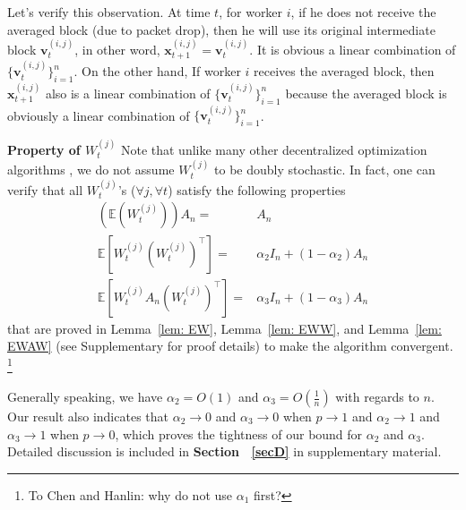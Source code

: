\documentclass{article}
\renewcommand{\paragraph}[1]{\noindent\textbf{#1}}
\def\rc{\color{red}}
\newcounter{ass_counter}
\newcounter{thm_counter}
\begin{document}
Let's verify this observation. At time $t$, for worker $i$, if he does not receive the averaged block (due to packet drop), then he will use its original intermediate block $\bm{v}_t^{(i,j)}$, in other word, $\bm{x}_{t+1}^{(i,j)} = \bm{v}_t^{(i,j)}$. It is obvious a linear combination of $\{\bm{v}_t^{(i,j)}\}_{i=1}^n$. On the other hand, If worker $i$ receives the averaged block, then $\bm{x}_{t+1}^{(i,j)}$ also is a linear combination of $\{\bm{v}_t^{(i,j)}\}_{i=1}^n$ because the averaged block is obviously a linear combination of $\{\bm{v}_t^{(i,j)}\}_{i=1}^n$.

\paragraph{Property of $W_t^{(j)}$} {\rc Note that unlike many other decentralized optimization algorithms \cite{}, we do not assume $W_t^{(j)}$ to be doubly stochastic. %
In fact, one can verify that all $W^{(j)}_t$'s ($\forall j, \forall t$) satisfy the following properties} 
\begin{align*}
\left(\mathbb E(W_{t}^{(j)})\right) A_n = & A_n\\
\mathbb E \left[ W_t^{(j)} \left( W_{t}^{(j)}\right)^{\top} \right] = &\alpha_2 I_n + (1-\alpha_2)A_n\\
\mathbb E \left[ W_t^{(j)} A_n\left( W_{t}^{(j)}\right)^{\top} \right] = &\alpha_3 I_n + (1-\alpha_3)A_n
\end{align*}
that are proved in Lemma~\ref{lem: EW}, Lemma~\ref{lem: EWW}, and Lemma~\ref{lem: EWAW} (see Supplementary for proof details) to make the algorithm convergent.
\footnote{\rc To Chen and Hanlin: why do not use $\alpha_1$ first?}

Generally speaking, we have $\alpha_2 = O\left( 1\right)$ and $\alpha_3 = O\left( \frac{1}{n} \right) $ with regards to $n$. Our result also indicates that $\alpha_2 \to 0$ and $\alpha_3 \to 0$ when $p\to 1$ and $\alpha_2 \to 1$ and $\alpha_3 \to 1$ when $p\to 0$, which proves the tightness of our bound for $\alpha_2$ and $\alpha_3$. Detailed discussion is included in \textbf{Section ~\ref{secD}} in {\rc supplementary material}.
\end{document}

